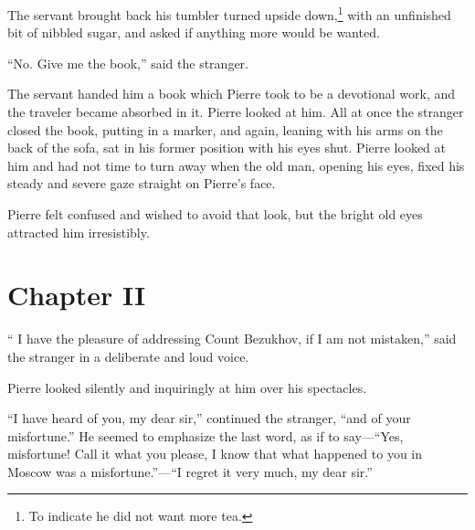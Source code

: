 The servant brought back his tumbler turned upside
down,\footnote{To indicate he did not want more tea.} with an
unfinished bit of nibbled sugar, and asked if anything more would
be wanted.

``No. Give me the book,'' said the stranger.

The servant handed him a book which Pierre took to be a
devotional work, and the traveler became absorbed in it. Pierre
looked at him. All at once the stranger closed the book, putting
in a marker, and again, leaning with his arms on the back of the
sofa, sat in his former position with his eyes shut. Pierre
looked at him and had not time to turn away when the old man,
opening his eyes, fixed his steady and severe gaze straight on
Pierre's face.

Pierre felt confused and wished to avoid that look, but the
bright old eyes attracted him irresistibly.


\chapter*{Chapter II}
\ifaudio     
{} 
\fi

\lettrine[lines=2, loversize=0.3, lraise=0]{ `` \initfamily I}{} have the pleasure of addressing Count Bezukhov, if I am not
mistaken,'' said the stranger in a deliberate and loud voice.

Pierre looked silently and inquiringly at him over his
spectacles.

``I have heard of you, my dear sir,'' continued the stranger,
``and of your misfortune.'' He seemed to emphasize the last word,
as if to say---``Yes, misfortune! Call it what you please, I know
that what happened to you in Moscow was a misfortune.''---``I
regret it very much, my dear sir.''

